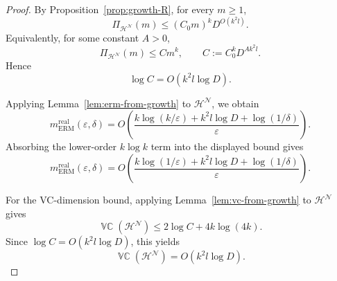 \documentclass[11pt]{article}
\theoremstyle{plain}
\theoremstyle{definition}
\theoremstyle{remark}
\DeclareMathOperator{\VCdim}{\mathbb{VC}}
\newcommand{\R}{\mathbb{R}}
\begin{document}
\begin{proof}
By Proposition~\ref{prop:growth-R}, for every \(m\ge 1\),
\[
\Pi_{\mathcal H^{\mathcal N}}(m)
\le
 (C_0m)^k D^{O(k^2l)}.
\]
Equivalently, for some constant \(A>0\),
\[
\Pi_{\mathcal H^{\mathcal N}}(m)\le C m^k,
\qquad
C:=C_0^k D^{A k^2l}.
\]
Hence
\[
\log C=O(k^2l\log D).
\]

Applying Lemma~\ref{lem:erm-from-growth} to \(\mathcal H^{\mathcal N}\), we obtain
\[
m_{\mathrm{ERM}}^{\mathrm{real}}(\varepsilon,\delta)
=
O\left(
\frac{
k\log(k/\varepsilon)
+
k^2l\log D
+
\log(1/\delta)
}{\varepsilon}
\right).
\]
Absorbing the lower-order \(k\log k\) term into the displayed bound gives
\[
m_{\mathrm{ERM}}^{\mathrm{real}}(\varepsilon,\delta)
=
O\left(
\frac{
k\log(1/\varepsilon)
+
k^2l\log D
+
\log(1/\delta)
}{\varepsilon}
\right).
\]

For the VC-dimension bound, applying Lemma~\ref{lem:vc-from-growth} to
\(\mathcal H^{\mathcal N}\) gives
\[
\VCdim(\mathcal H^{\mathcal N})
\le
2\log C+4k\log(4k).
\]
Since \(\log C=O(k^2l\log D)\), this yields
\[
\VCdim(\mathcal H^{\mathcal N})
=
O(k^2l\log D).
\]
\end{proof}








\end{document}
